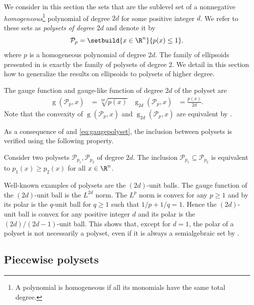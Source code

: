 \documentclass[11pt,twoside,a4paper,openright]{uclouvain-thesis}
\DeclareMathOperator{\gauge}{g}
\newcommand{\polyset}[1][p]{\mathcal{P}_{#1}}
\begin{document}
We consider in this section the sets that are the sublevel
set of a nonnegative \emph{homogeneous}\footnote{A polynomial is homogeneous if all its monomials have the same total degree.} polynomial of degree $2d$ for some positive integer $d$.
We refer to these sets as \emph{polysets of degree $2d$}
and denote it by
\begin{equation}
  \label{eq:polyset}
  \polyset = \setbuild{x \in \R^n}{p(x) \leq 1}.
\end{equation}
where $p$ is a homogeneous polynomial of degree $2d$.
The family of ellipsoids presented in 
is exactly the family of polysets of degree 2.
We detail in this section how to generalize the results on ellipsoids to polysets of higher degree.

The gauge function and gauge-like function of degree $2d$ of the polyset are
\begin{align}
  \label{eq:gaugepolyset}
  \gauge(\polyset, x) & = \sqrt[2d]{p(x)} &
  \gauge_{2d}(\polyset, x) & = \frac{p(x)}{2d}.
\end{align}
Note that the convexity of $\gauge(\polyset, x)$ and $\gauge_{2d}(\polyset, x)$ are equivalent by \cite[Corollary~15.3.1]{rockafellar2015convex}.

As a consequence of  and \eqref{eq:gaugepolyset},
the inclusion between polysets is verified using the following property.
\begin{myprop}
  \label{prop:polysetincl}
  Consider two polysets $\polyset[p_1], \polyset[p_2]$ of degree $2d$.
  The inclusion $\polyset[p_1] \subseteq \polyset[p_2]$ is equivalent to
  $p_1(x) \ge p_2(x)$ for all $x \in \R^n$.
\end{myprop}

Well-known examples of polysets are the $(2d)$-unit balls.
The gauge function of the $(2d)$-unit ball is the $L^{2d}$ norm.
The $L^{p}$ norm is convex for any $p \ge 1$ and by  its polar
is the $q$-unit ball for $q \ge 1$ such that $1/p + 1/q = 1$.
Hence the $(2d)$-unit ball is convex for any positive integer $d$ and its polar is the $(2d)/(2d-1)$-unit ball.
This shows that, except for $d = 1$, the polar of a polyset is not necessarily a polyset,
even if it is always a semialgebraic set by .

\subsection{Piecewise polysets}
\label{sec:piecepoly}
\end{document}
